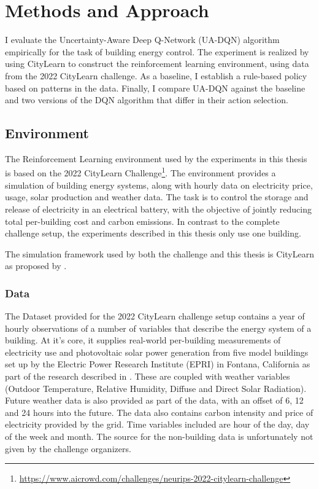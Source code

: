\chapter{Methods and Approach}
    \label{approach}

I evaluate the Uncertainty-Aware Deep Q-Network (UA-DQN) algorithm empirically for the task of building energy control.
The experiment is realized by using CityLearn to construct the reinforcement learning environment, using data from the 2022 CityLearn challenge.
As a baseline, I establish a rule-based policy based on patterns in the data.
Finally, I compare UA-DQN against the baseline and two versions of the DQN algorithm that differ in their action selection.





\section{Environment}
The Reinforcement Learning environment used by the experiments in this thesis is based on the 2022 CityLearn Challenge\footnote{\url{https://www.aicrowd.com/challenges/neurips-2022-citylearn-challenge}}.
The environment provides a simulation of building energy systems, along with hourly data on electricity price, usage, solar production and weather data.
The task is to control the storage and release of electricity in an electrical battery, with the objective of jointly reducing total per-building cost and carbon emissions.
In contrast to the complete challenge setup, the experiments described in this thesis only use one building.

The simulation framework used by both the challenge and this thesis is CityLearn as proposed by \citep{vazquez-canteli2019CityLearnV1OpenAI}.

\subsection{Data}
The Dataset provided for the 2022 CityLearn challenge setup contains a year of hourly observations of a number of variables that describe the energy system of a building.
At it's core, it supplies real-world per-building measurements of electricity use and photovoltaic solar power generation from five model buildings set up by the Electric Power Research Institute (EPRI) in Fontana, California as part of the research described in \cite{narayanamurthy2016GridIntegrationZero}.
These are coupled with weather variables (Outdoor Temperature, Relative Humidity, Diffuse and Direct Solar Radiation).
Future weather data is also provided as part of the data, with an offset of 6, 12 and 24 hours into the future.
The data also contains carbon intensity and price of electricity provided by the grid.
Time variables included are hour of the day, day of the week and month.
The source for the non-building data is unfortunately not given by the challenge organizers.

